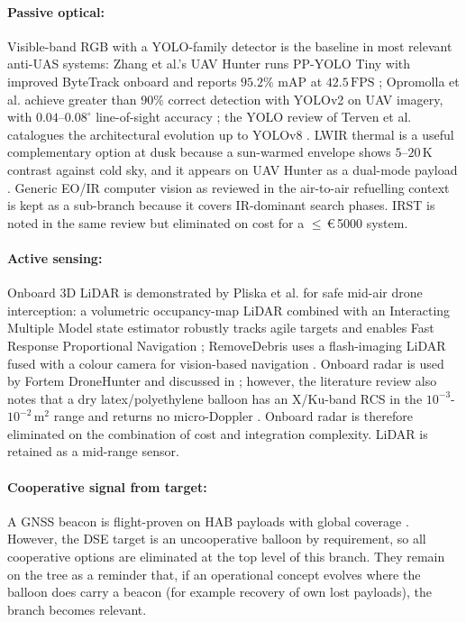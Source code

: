 \paragraph{Passive optical:} Visible-band RGB with a YOLO-family detector is the baseline in most relevant anti-UAS systems: Zhang et al.'s UAV Hunter runs PP-YOLO Tiny with improved ByteTrack onboard and reports $95.2\%$ mAP at $42.5\,\mathrm{FPS}$ \cite{Zhang2024UAVDefense}; Opromolla et al. achieve greater than $90\%$ correct detection with YOLOv2 on UAV imagery, with $0.04$--$0.08^\circ$ line-of-sight accuracy \cite{Opromolla2019AirborneLearning}; the YOLO review of Terven et al. catalogues the architectural evolution up to YOLOv8 \cite{Terven2023AYOLO-NAS}. LWIR thermal is a useful complementary option at dusk because a sun-warmed envelope shows $5$--$20\,\mathrm{K}$ contrast against cold sky, and it appears on UAV Hunter as a dual-mode payload \cite{Zhang2024UAVDefense}. Generic EO/IR computer vision as reviewed in the air-to-air refuelling context \cite{Parry2023ReviewAircraft} is kept as a sub-branch because it covers IR-dominant search phases. IRST is noted in the same review but eliminated on cost for a $\leq$\,\euro\,5000 system.

\paragraph{Active sensing:} Onboard 3D LiDAR is demonstrated by Pliska et al. for safe mid-air drone interception: a volumetric occupancy-map LiDAR combined with an Interacting Multiple Model state estimator robustly tracks agile targets and enables Fast Response Proportional Navigation \cite{Pliska2024TowardsCapture}; RemoveDebris uses a flash-imaging LiDAR fused with a colour camera for vision-based navigation \cite{Forshaw2020TheLaunch}. Onboard radar is used by Fortem DroneHunter \cite{Fortem} and discussed in \cite{Parry2023ReviewAircraft}; however, the literature review also notes that a dry latex/polyethylene balloon has an X/Ku-band RCS in the $10^{-3}$-$10^{-2}\,\mathrm{m}^2$ range and returns no micro-Doppler \cite{Fortem}. Onboard radar is therefore eliminated on the combination of cost and integration complexity. LiDAR is retained as a mid-range sensor.

\paragraph{Cooperative signal from target:} A GNSS beacon is flight-proven on HAB payloads with global coverage \cite{Clark2019AnPayloads}. However, the DSE target is an uncooperative balloon by requirement, so all cooperative options are eliminated at the top level of this branch. They remain on the tree as a reminder that, if an operational concept evolves where the balloon does carry a beacon (for example recovery of own lost payloads), the branch becomes relevant.

